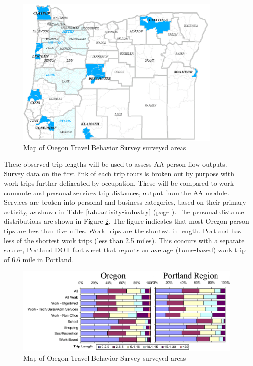 \begin{figure}[!t]    %
\centering
\includegraphics[width=4.0in]{aa/otbs-map}
\caption{Map of Oregon Travel Behavior Survey surveyed areas}
\label{fig:aa-obts-map}
\end{figure}

These observed trip lengths will be used to assess AA person flow outputs. Survey data on the first link of each trip tours is broken out by purpose with work trips further delineated by occupation. These will be compared to work commute and personal services trip distances, output from the AA module. Services are broken into personal and business categories, based on their primary activity, as shown in Table \ref{tab:activity-industry} (page \pageref{tab:activity-industry}). The personal distance distributions are shown in Figure \ref{fig:aa-personal-distance}. The figure indicates that most Oregon person tips are less than five miles. Work trips are the shortest in length. Portland has less of the shortest work trips (less than 2.5 miles). This concurs with a separate source, Portland DOT fact sheet that reports an average (home-based) work trip of 6.6 mile in Portland.

\begin{figure}    %
\centering
\includegraphics[width=6.0in]{aa/personal-distance}
\caption{Map of Oregon Travel Behavior Survey surveyed areas}
\label{fig:aa-personal-distance}
\end{figure}


